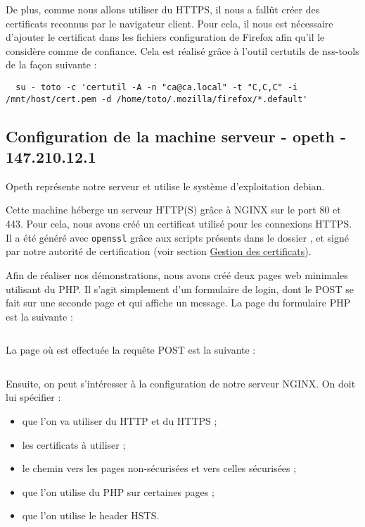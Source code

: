 De plus, comme nous allons utiliser du HTTPS, il nous a fallût créer des certificats reconnus par le navigateur client. Pour cela, il nous est nécessaire d'ajouter le certificat dans les fichiers configuration de Firefox afin qu'il le considère comme de confiance. Cela est réalisé grâce à l'outil certutils de nss-tools de la façon suivante :

\begin{verbatim}
  su - toto -c 'certutil -A -n "ca@ca.local" -t "C,C,C" -i /mnt/host/cert.pem -d /home/toto/.mozilla/firefox/*.default'
\end{verbatim}

\subsection{Configuration de la machine serveur - opeth - 147.210.12.1}

Opeth représente notre serveur et utilise le système d'exploitation debian.

Cette machine héberge un serveur HTTP(S) grâce à NGINX sur le port 80 et 443. Pour cela, nous avons créé un certificat utilisé pour les connexions HTTPS. Il a été généré avec \verb+openssl+ grâce aux scripts présents dans le dossier , et signé par notre autorité de certification (voir section \hyperref[sec:certificats]{Gestion des certificats}).

Afin de réaliser nos démonstrations, nous avons créé deux pages web minimales utilisant du PHP. Il s'agit simplement d'un formulaire de login, dont le POST se fait sur une seconde page et qui affiche un message. La page du formulaire PHP est la suivante :

\inputminted[bgcolor=lbcolor, breaklines]{html}{../sslstrip2/opeth/www/local/index.php}

La page où est effectuée la requête POST est la suivante :

\inputminted[bgcolor=lbcolor, breaklines]{php}{../sslstrip2/opeth/www/secure/index.php}

Ensuite, on peut s'intéresser à la configuration de notre serveur NGINX. On doit lui spécifier :

\begin{itemize}
\item que l'on va utiliser du HTTP et du HTTPS ;
\item les certificats à utiliser ;
\item le chemin vers les pages non-sécurisées et vers celles sécurisées ;
\item que l'on utilise du PHP sur certaines pages ;
\item que l'on utilise le header HSTS.
\end{itemize}

